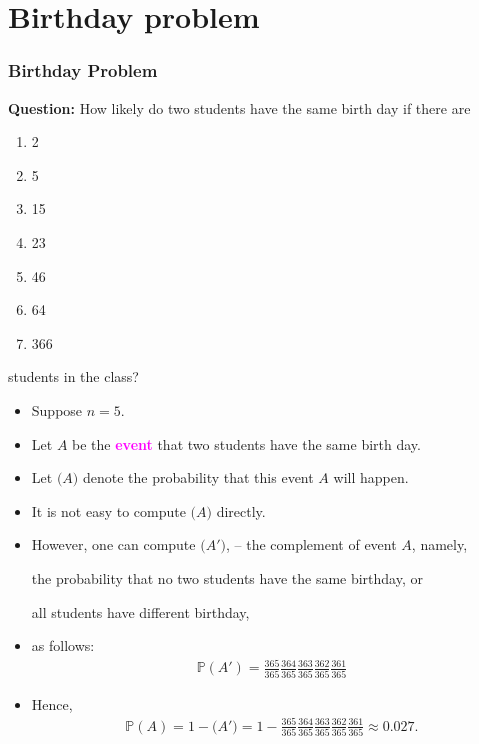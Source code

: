 \documentclass[9pt]{beamer}
\begin{document}
\section{Birthday problem}%
\begin{frame}[fragile,t] %
	\frametitle{Birthday Problem}
	{\bf Question:}
  How likely do two students have the same birth day if there are
	\begin{enumerate}
		\item 2
		\item 5
		\item 15
		\item 23
		\item 46
		\item 64
		\item 366
	\end{enumerate}
	students in the class?
\end{frame}
\begin{frame}[fragile,t] %
	\begin{itemize}
		\item Suppose $n=5$.
		\item Let $A$ be the \textcolor{magenta}{\bf event} that two students have the same birth day.
		\item Let $\mathbb(A)$ denote the probability that this event $A$ will happen.
		\item It is not easy to compute $\mathbb(A)$ directly.
		\item However, one can compute $\mathbb(A')$, -- the complement of event $A$, namely,
			\bigskip
			\begin{center}
				the probability that no two students have the same birthday, or\\
				\bigskip

				all students have different birthday,
			\end{center}
			\bigskip
		\item[]	as follows:
			 \begin{align*}
         \mathbb{P}(A') = \frac{365}{365} \frac{364}{365} \frac{363}{365} \frac{362}{365} \frac{361}{365}
			\end{align*}
	\item Hence,
		\begin{align*}
      \mathbb{P}(A) = 1 - \mathbb(A') = 1- \frac{365}{365} \frac{364}{365} \frac{363}{365} \frac{362}{365} \frac{361}{365}
			\approx 0.027.
		\end{align*}
	\end{itemize}
\end{frame}
\end{document}
